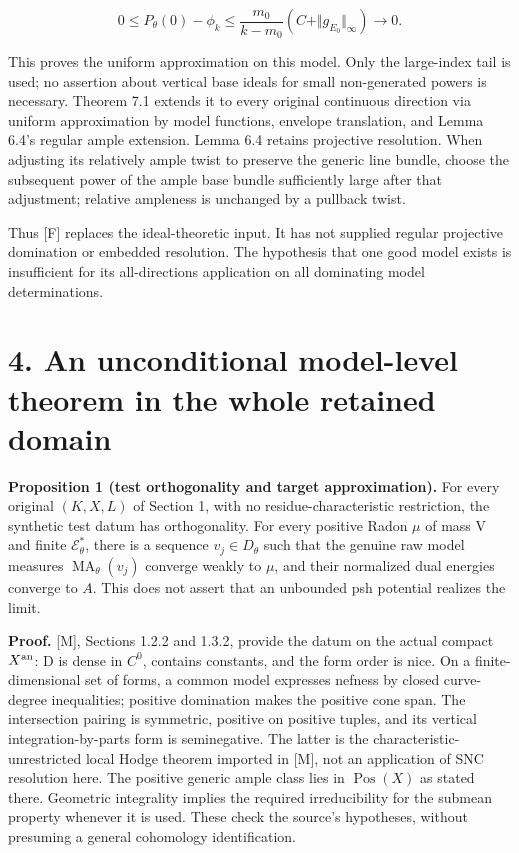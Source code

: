 \documentclass[11pt]{article}
\newcommand{\MA}{\operatorname{MA}}
\begin{document}
\[
0\leq P_\theta(0)-\phi_k
\leq\frac{m_0}{k-m_0}(C+\Vert g_{E_0}\Vert_\infty)\longrightarrow0.
\]

This proves the uniform approximation on this model. Only the large-index tail is used; no assertion about vertical base ideals for small non-generated powers is necessary. Theorem 7.1 extends it to every original continuous direction via uniform approximation by model functions, envelope translation, and Lemma 6.4's regular ample extension. Lemma 6.4 retains projective resolution. When adjusting its relatively ample twist to preserve the generic line bundle, choose the subsequent power of the ample base bundle sufficiently large after that adjustment; relative ampleness is unchanged by a pullback twist.

Thus [F] replaces the ideal-theoretic input. It has not supplied regular projective domination or embedded resolution. The hypothesis that one good model exists is insufficient for its all-directions application on all dominating model determinations.

\section*{4. An unconditional model-level theorem in the whole retained domain}

\textbf{Proposition 1 (test orthogonality and target approximation).} For every original \((K,X,L)\) of Section 1, with no residue-characteristic restriction, the synthetic test datum has orthogonality. For every positive Radon \(\mu\) of mass V and finite \(\mathcal E^*_\theta\), there is a sequence \(v_j\in D_\theta\) such that the genuine raw model measures \(\MA_\theta(v_j)\) converge weakly to \(\mu\), and their normalized dual energies converge to \(A\). This does not assert that an unbounded psh potential realizes the limit.

\textbf{Proof.} [M], Sections 1.2.2 and 1.3.2, provide the datum on the actual compact \(X^{\rm an}\): D is dense in \(C^0\), contains constants, and the form order is nice. On a finite-dimensional set of forms, a common model expresses nefness by closed curve-degree inequalities; positive domination makes the positive cone span. The intersection pairing is symmetric, positive on positive tuples, and its vertical integration-by-parts form is seminegative. The latter is the characteristic-unrestricted local Hodge theorem imported in [M], not an application of SNC resolution here. The positive generic ample class lies in \(\operatorname{Pos}(X)\) as stated there. Geometric integrality implies the required irreducibility for the submean property whenever it is used. These check the source's hypotheses, without presuming a general cohomology identification.
\end{document}

